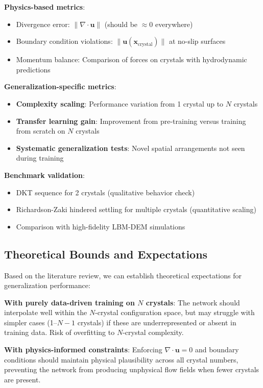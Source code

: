 \textbf{Physics-based metrics}:
\begin{itemize}
    \item Divergence error: $\|\nabla \cdot \mathbf{u}\|$ (should be $\approx 0$ everywhere)
    \item Boundary condition violations: $\|\mathbf{u}(\mathbf{x}_{\text{crystal}})\|$ at no-slip surfaces
    \item Momentum balance: Comparison of forces on crystals with hydrodynamic predictions
\end{itemize}

\textbf{Generalization-specific metrics}:
\begin{itemize}
    \item \textbf{Complexity scaling}: Performance variation from 1 crystal up to $N$ crystals
    \item \textbf{Transfer learning gain}: Improvement from pre-training versus training from scratch on $N$ crystals
    \item \textbf{Systematic generalization tests}: Novel spatial arrangements not seen during training
\end{itemize}

\textbf{Benchmark validation}:
\begin{itemize}
    \item DKT sequence for 2 crystals (qualitative behavior check)
    \item Richardson-Zaki hindered settling for multiple crystals (quantitative scaling)
    \item Comparison with high-fidelity LBM-DEM simulations
\end{itemize}

\subsection{Theoretical Bounds and Expectations}

Based on the literature review, we can establish theoretical expectations for generalization performance:

\textbf{With purely data-driven training on $N$ crystals}: The network should interpolate well within the $N$-crystal configuration space, but may struggle with simpler cases (1--$N-1$ crystals) if these are underrepresented or absent in training data. Risk of overfitting to $N$-crystal complexity.

\textbf{With physics-informed constraints}: Enforcing $\nabla \cdot \mathbf{u} = 0$ and boundary conditions should maintain physical plausibility across all crystal numbers, preventing the network from producing unphysical flow fields when fewer crystals are present.


